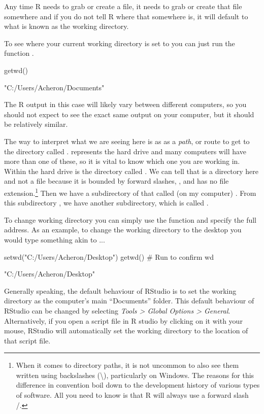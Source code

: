 Any time R needs to grab or create a file, it needs to grab or create that file somewhere and if you do not tell R where that somewhere is, it will default to what is known as the \gls{working directory}.

To see where your current working directory is set to you can just run the function .

\begin{inR}
getwd()
\end{inR}

\begin{outR}
[1] "C:/Users/Acheron/Documents"
\end{outR}

\noindent The R output in this case will likely vary between different computers, so you should not expect to see the exact same output on your computer, but it should be relatively similar.

The way to interpret what we are seeing here is as as a \textit{path}, or route to get to the directory called .  represents the hard drive and many computers will have more than one of these, so it is vital to know which one you are working in. Within the hard drive is the directory called . We can tell that  is a directory here and not a file because it is bounded by forward slashes, \R{/}, and has no file extension.\footnote{When it comes to directory paths, it is not uncommon to also see them written using backslashes (\textbackslash), particularly on Windows. The reasons for this difference in convention boil down to the development history of various types of software. All you need to know is that R will always use a forward slash /.} Then we have a subdirectory of that called (on my computer) .  From this subdirectory , we have another subdirectory, which is called .

To change working directory you can simply use the function  and specify the full address. As an example, to change the working directory to the desktop you would type something akin to ...

\begin{inR}
setwd("C:/Users/Acheron/Desktop")
getwd() # Run to confirm wd
\end{inR}

\begin{outR}
[1] "C:/Users/Acheron/Desktop"
\end{outR}

Generally speaking, the default behaviour of RStudio is to set the working directory as the computer's main ``Documents'' folder. This default behaviour of RStudio can be changed by selecting \textit{Tools > Global Options > General}. Alternatively, if you open a script file in R studio by clicking on it with your mouse, RStudio will automatically set the working directory to the location of that script file.

